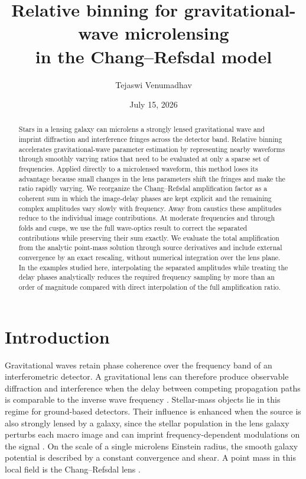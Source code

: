 \documentclass[aps,prd,twocolumn,nofootinbib,superscriptaddress,floatfix]{revtex4-2}
\begin{document}
\title{Relative binning for gravitational-wave microlensing\\
in the Chang--Refsdal model}

\author{Tejaswi Venumadhav}
\date{July 15, 2026}

\begin{abstract}
Stars in a lensing galaxy can microlens a strongly lensed gravitational wave
and imprint diffraction and interference fringes across the detector band.
Relative binning accelerates gravitational-wave parameter estimation by
representing nearby waveforms through smoothly varying ratios that need to be
evaluated at only a sparse set of frequencies.  Applied directly to a
microlensed waveform, this method loses its advantage because small changes in
the lens parameters shift the fringes and make the ratio rapidly varying.  We
reorganize the Chang--Refsdal amplification factor as a coherent sum in which
the image-delay phases are kept explicit and the remaining complex amplitudes
vary slowly with frequency.  Away from caustics these amplitudes reduce to the
individual image contributions.  At moderate frequencies and through folds
and cusps, we use the full wave-optics result to correct the separated
contributions while preserving their sum exactly.  We evaluate the total
amplification from the analytic point-mass solution through source derivatives
and include external convergence by an exact rescaling, without numerical
integration over the lens plane.  In the examples studied here, interpolating
the separated amplitudes while treating the delay phases analytically reduces
the required frequency sampling by more than an order of magnitude compared
with direct interpolation of the full amplification ratio.
\end{abstract}

\maketitle

\section{Introduction}
\label{sec:introduction}

Gravitational waves retain phase coherence over the frequency band of an
interferometric detector.  A gravitational lens can therefore produce
observable diffraction and interference when the delay between competing
propagation paths is comparable to the inverse wave frequency
\cite{NakamuraDeguchi1999,TakahashiNakamura2003}.  Stellar-mass objects lie in
this regime for ground-based detectors.  Their influence is enhanced when the
source is also strongly lensed by a galaxy, since the stellar population in
the lens galaxy perturbs each macro image and can imprint frequency-dependent
modulations on the signal
\cite{ChristianVitaleLoeb2018,MeenaBagla2020,MishraEtAl2021}.  On the scale of
a single microlens Einstein radius, the smooth galaxy potential is described by
a constant convergence and shear.  A point mass in this local field is the
Chang--Refsdal lens \cite{ChangRefsdal1979,ChangRefsdal1984,AnEvans2006}.
\end{document}
